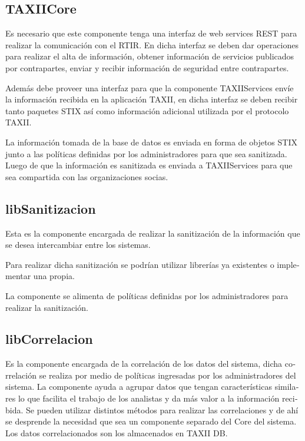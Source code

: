 \documentclass[11pt]{article}
\begin{document}
\subsection[TAXIICore]{\foreignlanguage{spanish}{TAXIICore}}
\foreignlanguage{spanish}{Es necesario que este componente tenga una interfaz de web services REST para realizar la
comunicación con el RTIR. En dicha interfaz se deben dar operaciones para realizar el alta de información, obtener
información de servicios publicados por contrapartes, enviar y recibir información de seguridad entre contrapartes.}

\foreignlanguage{spanish}{Además debe proveer una interfaz para que la componente TAXIIServices envíe la información
recibida en la aplicación TAXII, en dicha interfaz se deben recibir tanto paquetes STIX así como información adicional
utilizada por el protocolo TAXII. }

\foreignlanguage{spanish}{La información tomada de la base de datos es enviada en forma de objetos STIX junto a las
políticas definidas por los administradores para que sea sanitizada. Luego de que la información es sanitizada es
enviada a TAXIIServices para que sea compartida con las organizaciones socias.}

\subsection[libSanitizacion]{\foreignlanguage{spanish}{libSanitizacion}}
\foreignlanguage{spanish}{Esta es la componente encargada de realizar la sanitización de la información que se desea
intercambiar entre los sistemas. }

\foreignlanguage{spanish}{Para realizar dicha sanitización se podrían utilizar librerías ya existentes o implementar una
propia.}

\foreignlanguage{spanish}{La componente se alimenta de políticas definidas por los administradores para realizar la
sanitización.}

\subsection[libCorrelacion]{\foreignlanguage{spanish}{libCorrelacion}}
\foreignlanguage{spanish}{Es la componente encargada de la correlación de los datos del sistema, dicha correlación se
realiza por medio de políticas ingresadas por los administradores del sistema. La componente ayuda a agrupar datos que
tengan características similares lo que facilita el trabajo de los analistas y da más valor a la información recibida.
Se pueden utilizar distintos métodos para realizar las correlaciones y de ahí se desprende la necesidad que sea un
componente separado del Core del sistema. Los datos correlacionados son los almacenados en TAXII DB.}
\end{document}
